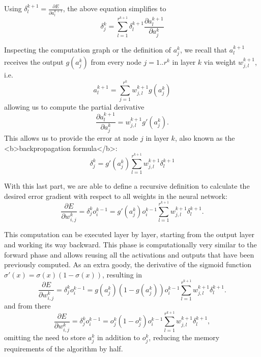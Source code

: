 Using $\delta^{k+1}_l=\frac{\partial E}{\partial a_l^{k+1}}$, the above equation simplifies to
\begin{equation}
\delta^k_j=\sum_{l=1}^{r^{k+1}}\delta_l^{k+1}\frac{\partial a_l^{k+1}}{\partial a^k_j}
\end{equation}

Inspecting the computation graph or the definition of $a^k_j$, we recall that $a_l^{k+1}$ receives the output $g(a_j^k)$ from every node $j=1..r^k$ in layer $k$ via weight $w_{j,l}^{k+1}$, i.e.
\begin{equation}
a_l^{k+1}=\sum_{j=1}^{r^k}w_{j,l}^{k+1}g(a_j^k)
\end{equation}
allowing us to compute the partial derivative
\begin{equation}
\frac{\partial a_l^{k+1}}{\partial a^k_j}=w_{j,l}^{k+1}g'(a_j^k).
\end{equation}
This allows us to provide the error at node $j$ in layer $k$, also known as the <b>backpropagation formula</b>:
\begin{equation}
\delta^k_j=g'(a^k_j)\sum_{l=1}^{r^{k+1}}w_{j,l}^{k+1}\delta^{k+1}_l
\end{equation}

With this last part, we are able to define a recursive definition to calculate the desired error gradient with respect to all weights in the neural network:
\begin{equation}
\frac{\partial E}{\partial w_{i,j}^k}=\delta_j^ko_i^{k-1}=g'(a_j^k)o_i^{k-1}\sum_{l=1}^{r^{k+1}}w_{j,l}^{k+1}\delta_l^{k+1}.
\end{equation}

This computation can be executed layer by layer, starting from the output layer and working its way backward. This phase is computationally very similar to the forward phase and allows reusing all the activations and outputs that have been previously computed. As an extra goody, the derivative of the sigmoid function $\sigma'(x)=\sigma(x)(1-\sigma(x))$, resulting in
\begin{equation}
\frac{\partial E}{\partial w_{i,j}^k}=\delta_j^ko_i^{k-1}=g(a_j^k)(1-g(a_j^k))o_i^{k-1}\sum_{l=1}^{r^{k+1}}w_{j,l}^{k+1}\delta_l^{k+1}.
\end{equation}
and from there
\begin{equation}
\frac{\partial E}{\partial w_{i,j}^k}=\delta_j^ko_i^{k-1}=o_j^k(1-o_j^k)o_i^{k-1}\sum_{l=1}^{r^{k+1}}w_{j,l}^{k+1}\delta_l^{k+1},
\end{equation}
omitting the need to store $a_j^k$ in addition to $o_j^k$, reducing the memory requirements of the algorithm by half.

